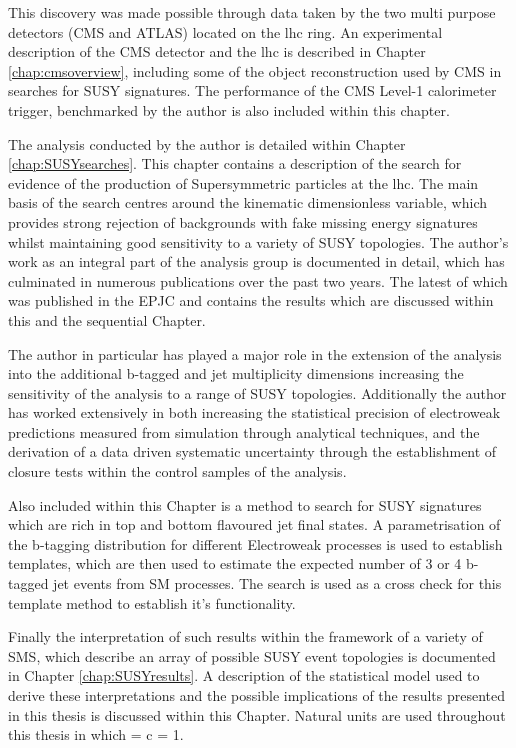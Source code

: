 This discovery was made possible through data taken by the two multi purpose detectors (\ac{CMS} and \ac{ATLAS}) located on the \ac{lhc} ring. An experimental description of the \ac{CMS} detector and the \ac{lhc} is described in Chapter \ref{chap:cmsoverview}, including some of the object reconstruction used by \ac{CMS} in searches for \ac{SUSY} signatures. The performance of the \ac{CMS} Level-1 calorimeter trigger, benchmarked by the author is also included within this chapter.

The analysis conducted by the author is detailed within Chapter \ref{chap:SUSYsearches}. This chapter contains a description of the search for evidence of the production of Supersymmetric particles at the \ac{lhc}. The main basis of the search centres around the kinematic dimensionless \alphat variable, which provides strong rejection of backgrounds with fake missing energy signatures whilst maintaining good sensitivity to a variety of \ac{SUSY} topologies. The author's work as an integral part of the analysis group is documented in detail, which has culminated in numerous publications over the past two years. The latest of which was published in the \acf{EPJC} \cite{ra1_epjc} and contains the results which are discussed within this and the sequential Chapter. 

The author in particular has played a major role in the extension of the \alphat analysis into the additional b-tagged and jet multiplicity dimensions increasing the sensitivity of the analysis to a range of \ac{SUSY} topologies. Additionally the author has worked extensively in both increasing the statistical precision of electroweak predictions measured from simulation through analytical techniques, and the derivation of a data driven systematic uncertainty through the establishment of closure tests within the control samples of the analysis. 

Also included within this Chapter is a method to search for \ac{SUSY} signatures which are rich in top and bottom flavoured jet final states. A parametrisation of the b-tagging distribution for different Electroweak processes is used to establish templates, which are then used to estimate the expected number of 3 or 4 b-tagged jet events from \ac{SM} processes. The \alphat search is used as a cross check for this template method to establish it's functionality. 

Finally the interpretation of such results within the framework of a variety of \acf{SMS}, which describe an array of possible \ac{SUSY} event topologies is documented in Chapter \ref{chap:SUSYresults}. A description of the statistical model used to derive these interpretations and the possible implications of the results presented in this thesis is discussed within this Chapter. Natural units are used throughout this thesis in which \hbarred = c = 1.
